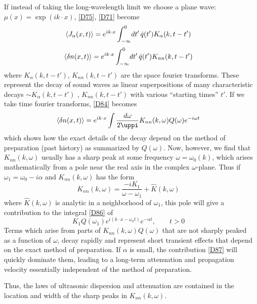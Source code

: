 If instead of taking the long-wavelength limit we choose a plane wave: $\mu(x) = \exp(i k\cdot x)$, \eqref{D75}, \eqref{D71} become
\begin{equation}
	\langle J_\alpha(x, t)\rangle = e^{i k\cdot x} \int_{-\infty}^{0}\! \mathop{}\!d t'\, \dot{q}(t') K_\alpha (k, t - t')
\end{equation}
\begin{equation}
	\label{D84}
	\langle\mathop{}\!\delta n(x, t)\rangle = e^{i k\cdot x} \int_{-\infty}^{0}\! \mathop{}\!d t'\, \dot{q}(t') K_{nn} (k, t - t')
\end{equation}
where $K_\alpha (k, t - t') $, $K_{nn} (k, t - t')$ are the space fourier transforms.
These represent the decay of sound waves as linear superpositions of many characteristic decays $\sim  K_\alpha (k, t - t')$ , $K_{nn} (k, t - t')$ with various ``starting times'' $t'$.
If we take time fourier transforms, \eqref{D84} becomes
\begin{equation}
	\label{D85}
	\mean{\ddel n(x, t)} = e^{i k\cdot x} \int \frac{\dd \omega}{2\uppi} K_{nn}(k, \omega) Q(\omega) e^{-i\omega t}
\end{equation}
which shows how the exact details of the decay depend on the method of preparation (past history) as summarized by $Q(\omega)$.
Now, however, we find that $K_{nn}(k, \omega)$ usually has a sharp peak at some frequency $\omega = \omega_0(k)$, which arises mathematically from a pole near the real axis in the complex $\omega$-plane.
Thus if
$\omega_1 = \omega_0 - i\alpha$ and $K_{nn}(k, \omega)$ has the form
\begin{equation}
	\label{D86}
	K_{nn}(k, \omega) = \frac{-i K_1}{\omega - \omega_1} + \hat{K}(k, \omega)
\end{equation}
where $\hat{K}(k, \omega)$ is analytic in a neighborhood of $\omega_1$, this pole will give a contribution to the integral \eqref{D86} of
\begin{equation}
	\label{D87}
	K_1 Q(\omega_1) e^{i (k\cdot x - \omega_0 t)} e^{-\alpha t}, \qquad t > 0
\end{equation}
Terms which arise from parts of $K_{nn}(k, \omega) Q(\omega)$ that are not sharply peaked as a function of $\omega$, decay rapidly and represent short transient effects that depend on the exact method of preparation.
If $\alpha$ is small, the contribution \eqref{D87} will quickly dominate them, leading to a long-term attenuation and propagation velocity essentially independent of the method of preparation.

Thus, the laws of ultrasonic dispersion and attenuation are contained in the location and width of the sharp peaks in $K_{nn}(k, \omega)$.


